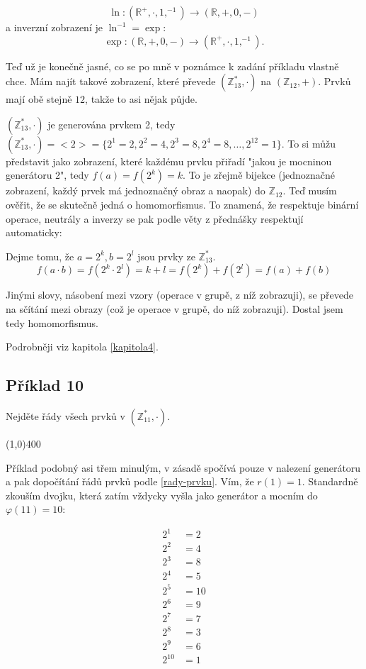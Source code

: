 \documentclass{article}
\begin{document}
$$\ln: (\mathbb{R}^+, \cdot , 1, ^{-1}) \rightarrow (\mathbb{R},+, 0,-)$$
a inverzní zobrazení je $\ln^{-1} = \exp$:
$$\exp: (\mathbb{R},+, 0,-) \rightarrow (\mathbb{R}^+, \cdot , 1, ^{-1}).$$

Teď už je konečně jasné, co se po mně v poznámce k zadání příkladu vlastně chce. Mám najít takové zobrazení, které převede $(\mathbb{Z}_{13}^{*},\cdot)$ na $(\mathbb{Z}_{12},+)$. Prvků mají obě stejně $12$, takže to asi nějak půjde.

$(\mathbb{Z}_{13}^{*},\cdot)$ je generována prvkem 2, tedy $(\mathbb{Z}_{13}^{*},\cdot) = {<}2{>} = \{2^1=2, 2^2=4, 2^3=8, 2^4 = 8,\ldots,2^{12}=1\}$. To si můžu představit jako zobrazení, které každému prvku přiřadí "jakou je mocninou generátoru 2", tedy $f(a)=f(2^k)=k$. To je zřejmě bijekce (jednoznačné zobrazení, každý prvek má jednoznačný obraz a naopak) do $\mathbb{Z}_{12}$. Teď musím ověřit, že se skutečně jedná o homomorfismus. To znamená, že respektuje binární operace, neutrály a inverzy se pak podle věty z přednášky respektují automaticky:

Dejme tomu, že $a = 2^k, b = 2^l$ jsou prvky ze $\mathbb{Z}_{13}^{*}$.
\[ f(a\cdot b) = f(2^k \cdot 2^l) = k + l = f(2^k) + f(2^l) = f(a) + f(b) \]

Jinými slovy, násobení mezi vzory (operace v grupě, z níž zobrazuji), se převede na sčítání mezi obrazy (což je operace v grupě, do níž zobrazuji). Dostal jsem tedy homomorfismus.   

Podrobněji viz kapitola \ref{kapitola4}.


\subsection{Příklad 10}
Nejděte řády všech prvků v $(\mathbb{Z}_{11}^*, \cdot)$.

\line(1,0){400}

Příklad podobný asi třem minulým, v zásadě spočívá pouze v nalezení generátoru a pak dopočítání řádů prvků podle \ref{rady-prvku}. Vím, že $r(1) = 1$. Standardně zkouším dvojku, která zatím vždycky vyšla jako generátor a mocním do $\varphi(11) = 10$:

\begin{align*}
2^1 & = 2\\
2^2 & = 4\\
2^3 & = 8\\
2^4 & = 5\\
2^5 & = 10\\
2^6 & = 9\\
2^7 & = 7\\
2^8 & = 3\\
2^9 & = 6\\
2^{10} & = 1\\
\end{align*}
\end{document}
